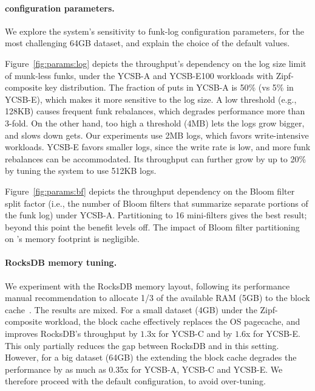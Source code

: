 \paragraph{\sys\/ configuration parameters.} 
We explore the system's  sensitivity to funk-log configuration parameters, for the most challenging 64GB dataset, 
and explain the choice of the default values.

Figure~\ref{fig:params:log} depicts the throughput's dependency on the log size limit of munk-less funks, 
under the YCSB-A and YCSB-E100 workloads with Zipf-composite key distribution. 
The fraction of puts in YCSB-A is 50\% (vs 5\% in YCSB-E), which makes it more sensitive to the log size. 
A low threshold (e.g., 128KB) causes frequent funk rebalances, which degrades performance more than 3-fold. 
On the other hand, too high a threshold (4MB) lets the logs grow bigger, and slows down gets. Our experiments  
use 2MB logs, which favors write-intensive workloads. YCSB-E favors smaller logs, since the write 
rate is low, and more funk rebalances can be accommodated. Its throughput can further grow by up to 20\% 
by tuning the system to use 512KB logs.

Figure~\ref{fig:params:bf} depicts the throughput dependency on the Bloom filter split factor (i.e., the 
number of Bloom filters that summarize separate portions of the funk log) under YCSB-A. 
Partitioning to 16 mini-filters gives the best result; beyond this point the benefit levels off. 
The impact of Bloom filter partitioning on \sys's %
memory footprint is negligible.

\paragraph{RocksDB memory tuning.} We experiment with the RocksDB memory layout, 
following its performance manual recommendation to allocate 1/3 of the available RAM 
(5GB) to the block cache~\cite{RocksDBMemoryTuning}. The results are mixed. For a small 
dataset (4GB) under the Zipf-composite workload, the block cache effectively replaces 
the OS pagecache, and improves RocksDB's throughput by $1.3$x for YCSB-C 
and by $1.6$x for YCSB-E. This only partially reduces the gap between
RocksDB and \sys\/ in this setting. However, for a big dataset (64GB) the extending the 
block cache degrades the performance by as much as 0.35x for YCSB-A, YCSB-C and 
YCSB-E. We therefore proceed with the default configuration, to avoid over-tuning. 

